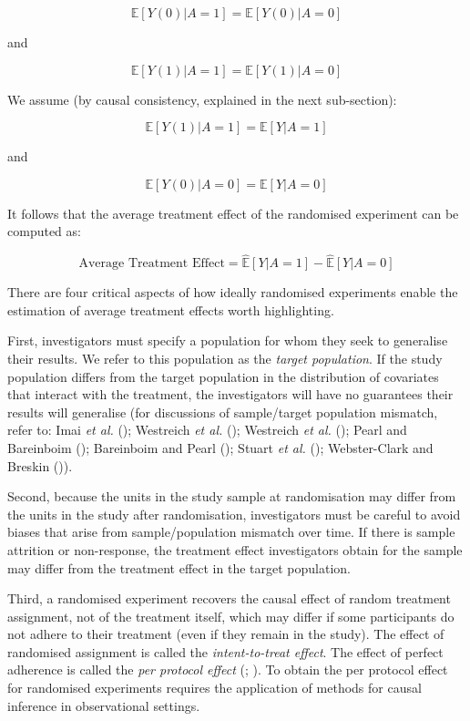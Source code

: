 \documentclass[
  single column]{article}
\begin{document}
\[
\mathbb{E}[Y(0) | A = 1] = \mathbb{E}[Y(0) | A = 0]
\]

and

\[
\mathbb{E}[Y(1) | A = 1] = \mathbb{E}[Y(1) | A = 0]
\]

We assume (by causal consistency, explained in the next sub-section):

\[ 
\mathbb{E}[Y(1) | A = 1] = \mathbb{E}[Y | A = 1]
\]

and

\[
\mathbb{E}[Y(0) | A = 0] = \mathbb{E}[Y | A = 0]
\]

It follows that the average treatment effect of the randomised
experiment can be computed as:

\[
\text{Average Treatment Effect} = \widehat{\mathbb{E}}[Y | A = 1] - \widehat{\mathbb{E}}[Y | A = 0]
\]

There are four critical aspects of how ideally randomised experiments
enable the estimation of average treatment effects worth highlighting.

First, investigators must specify a population for whom they seek to
generalise their results. We refer to this population as the
\emph{target population}. If the study population differs from the
target population in the distribution of covariates that interact with
the treatment, the investigators will have no guarantees their results
will generalise (for discussions of sample/target population mismatch,
refer to: Imai \emph{et al.}
(); Westreich \emph{et
al.} (); Westreich \emph{et al.}
(); Pearl and Bareinboim
(); Bareinboim and Pearl
(); Stuart \emph{et al.}
(); Webster-Clark and
Breskin ()).

Second, because the units in the study sample at randomisation may
differ from the units in the study after randomisation, investigators
must be careful to avoid biases that arise from sample/population
mismatch over time. If there is sample attrition or non-response, the
treatment effect investigators obtain for the sample may differ from the
treatment effect in the target population.

Third, a randomised experiment recovers the causal effect of random
treatment assignment, not of the treatment itself, which may differ if
some participants do not adhere to their treatment (even if they remain
in the study). The effect of randomised assignment is called the
\emph{intent-to-treat effect}. The effect of perfect adherence is called
the \emph{per protocol effect} (; ).
To obtain the per protocol effect for randomised experiments requires
the application of methods for causal inference in observational
settings.
\end{document}
